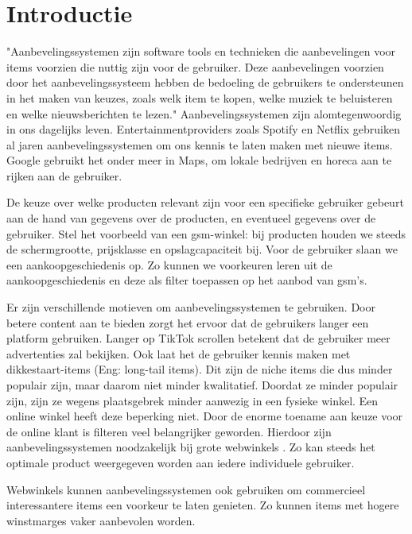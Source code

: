 \chapter{Introductie}

"Aanbevelingssystemen zijn software tools en technieken die aanbevelingen voor items voorzien die nuttig zijn voor de gebruiker. Deze aanbevelingen voorzien door het aanbevelingssysteem hebben de bedoeling de gebruikers te ondersteunen in het maken van keuzes, zoals welk item te kopen, welke muziek te beluisteren en welke nieuwsberichten te lezen." \cite{recsys_handbook}
Aanbevelingssystemen zijn alomtegenwoordig in ons dagelijks leven. Entertainmentproviders zoals Spotify en Netflix gebruiken al jaren aanbevelingssystemen om ons kennis te laten maken met nieuwe items. Google gebruikt het onder meer in Maps, om lokale bedrijven en horeca aan te rijken aan de gebruiker.

De keuze over welke producten relevant zijn voor een specifieke gebruiker gebeurt aan de hand van gegevens over de producten, en eventueel gegevens over de gebruiker. Stel het voorbeeld van een gsm-winkel: bij producten houden we steeds de schermgrootte, prijsklasse en opslagcapaciteit bij. Voor de gebruiker slaan we een aankoopgeschiedenis op. Zo kunnen we voorkeuren leren uit de aankoopgeschiedenis en deze als filter toepassen op het aanbod van gsm's.

Er zijn verschillende motieven om aanbevelingssystemen te gebruiken.
Door betere content aan te bieden zorgt het ervoor dat de gebruikers langer een platform gebruiken. Langer op TikTok scrollen betekent dat de gebruiker meer advertenties zal bekijken. \cite{tiktokalgorithm}
Ook laat het de gebruiker kennis maken met dikkestaart-items (Eng: long-tail items). Dit zijn de niche items die dus minder populair zijn, maar daarom niet minder kwalitatief. Doordat ze minder populair zijn, zijn ze wegens plaatsgebrek minder aanwezig in een fysieke winkel. Een online winkel heeft deze beperking niet. Door de enorme toename aan keuze voor de online klant is filteren veel belangrijker geworden. Hierdoor zijn aanbevelingssystemen noodzakelijk bij grote webwinkels \cite{rise_of_recsys_in_ecommerce}. Zo kan steeds het optimale product weergegeven worden aan iedere individuele gebruiker. \cite{cursus_hs2}

Webwinkels kunnen aanbevelingssystemen ook gebruiken om commercieel interessantere items een voorkeur te laten genieten. Zo kunnen items met hogere winstmarges vaker aanbevolen worden.

